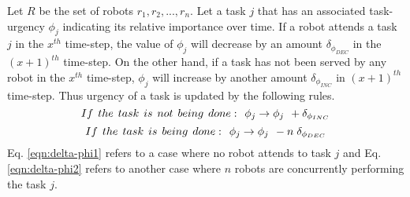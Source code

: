 Let $R$ be the set of robots ${r_1, r_2,...,r_n}$. Let a task $j$ that has an associated task-urgency $\phi_j$ indicating its relative importance over time.
If a robot attends a task $j$ in the $x^{th}$ time-step, the value of $\phi_j$ will decrease by an amount $\delta_{\phi_{DEC}}$ in the $(x+1)^{th}$ time-step.
On the other hand, if a task has not been served by any robot in the $x^{th}$ time-step, $\phi_j$ will increase by another amount  $\delta_{\phi_{INC}}$  in $(x+1)^{th}$ time-step. Thus
urgency of a task is updated by the following rules.
\begin{equation}
 If\hspace*{0.15cm}the\hspace*{0.15cm} task\hspace*{0.15cm}is\hspace*{0.15cm}not\hspace*{0.15cm}being\hspace*{0.15cm} done:\hspace*{0.15cm}  \phi_j \rightarrow   \phi_j \hspace*{0.15cm} + \delta_{\phi_{INC}}
\label{eqn:delta-phi1}
\end{equation}
\begin{equation}
 If\hspace*{0.15cm}the \hspace*{0.15cm}task\hspace*{0.15cm}is\hspace*{0.15cm}being\hspace*{0.15cm}done:\hspace*{0.15cm}  \phi_j \rightarrow   \phi_j \hspace*{0.15cm} - n\hspace*{0.10cm}\delta_{\phi_{DEC}}
\label{eqn:delta-phi2}
\end{equation}
Eq. \ref{eqn:delta-phi1} refers to a case where no robot attends to task $j$ and Eq. \ref{eqn:delta-phi2} refers to another case where $n$ robots are concurrently performing the task $j$.

